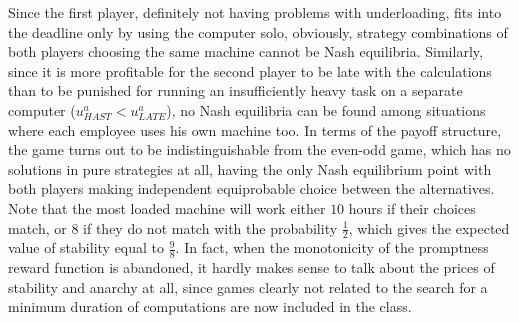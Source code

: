 Since the first player, definitely not having problems with underloading, fits into the deadline only by using the computer solo, obviously, strategy combinations of both players choosing the same machine cannot be Nash equilibria. Similarly, since it is more profitable for the second player to be late with the calculations than to be punished for running an insufficiently heavy task on a separate computer ($u^a_{HAST} < u^a_{LATE}$), no Nash equilibria can be found among situations where each employee uses his own machine too. In terms of the payoff structure, the game turns out to be indistinguishable from the even-odd game, which has no solutions in pure strategies at all, having the only Nash equilibrium point with both players making independent equiprobable choice between the alternatives. Note that the most loaded machine will work either $10$ hours if their choices match, or $8$ if they do not match with the probability $\frac{1}{2}$, which gives the expected value of stability equal to $\frac{9}{8}$. In fact, when the monotonicity of the promptness reward function is abandoned, it hardly makes sense to talk about the prices of stability and anarchy at all, since games clearly not related to the search for a minimum duration of computations are now included in the class. %

